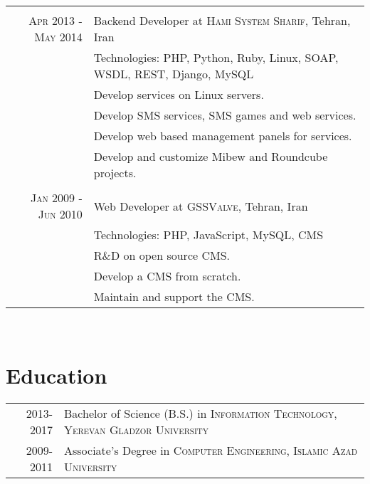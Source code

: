 \documentclass[a4paper,11pt]{article}
\begin{document}
\begin{tabular}{r|p{11cm}}
    \multicolumn{2}{c}{}\\
    \textsc{Apr 2013 - May 2014}
    & Backend Developer at \textsc{Hami System Sharif},
    Tehran, Iran\\
    &\footnotesize{Technologies: PHP, Python, Ruby, Linux, SOAP, WSDL, REST, Django, MySQL}\\
    &\footnotesize{Develop services on Linux servers.}\\
    &\footnotesize{Develop SMS services, SMS games and web services.}\\
    &\footnotesize{Develop web based management panels for services.}\\
    &\footnotesize{Develop and customize Mibew and Roundcube projects.}\\

    \multicolumn{2}{c}{}\\
    \textsc{Jan 2009 - Jun 2010}
    & Web Developer at \textsc{GSSValve},
    Tehran, Iran\\
    &\footnotesize{Technologies: PHP, JavaScript, MySQL, CMS}\\
    &\footnotesize{R\&D on open source CMS.}\\
    &\footnotesize{Develop a CMS from scratch.}\\
    &\footnotesize{Maintain and support the CMS.}

\end{tabular}\\

\section{Education}
\begin{tabular}{rp{12cm}}

    \textsc{} 2013-2017 & Bachelor of Science (B.S.) in \textsc{Information Technology},
    \textsc{Yerevan Gladzor University}\\

    \textsc{} 2009-2011 & Associate’s Degree in \textsc{Computer Engineering},
    \textsc{Islamic Azad University}\\

\end{tabular}\\

\end{document}
